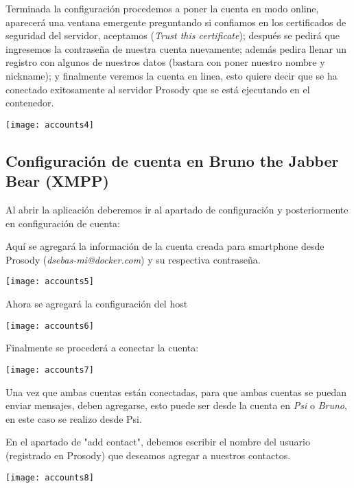 \documentclass[10pt,letterpaper]{article}
\begin{document}
Terminada la configuración procedemos a poner la cuenta en modo online, aparecerá una ventana emergente preguntando si confiamos en los certificados de seguridad del servidor, aceptamos (\textit{Trust this certificate}); después se pedirá que ingresemos la contraseña de nuestra cuenta nuevamente; además pedira llenar un registro con algunos de nuestros datos (bastara con poner nuestro nombre y nickname); y finalmente veremos la cuenta en linea, esto quiere decir que se ha conectado exitosamente al servidor Prosody que se está ejecutando en el contenedor.

\begin{center}
\texttt{[image: accounts4]}
\end{center}

\subsection{Configuración de cuenta en Bruno the Jabber Bear (XMPP)}

Al abrir la aplicación deberemos ir al apartado de configuración y posteriormente en configuración de cuenta:

Aquí se agregará la información de la cuenta creada para smartphone desde Prosody (\textit{dsebas-mi@docker.com}) y su respectiva contraseña.

\begin{center}
\texttt{[image: accounts5]}
\end{center}

Ahora se agregará la configuración del host

\begin{center}
\texttt{[image: accounts6]}
\end{center}

Finalmente se procederá a conectar la cuenta: 

\begin{center}
\texttt{[image: accounts7]}
\end{center}

Una vez que ambas cuentas están conectadas, para que ambas cuentas se puedan enviar mensajes, deben agregarse, esto puede ser desde la cuenta en \textit{Psi} o \textit{Bruno}, en este caso se realizo desde Psi.

En el apartado de "add contact", debemos escribir el nombre del usuario (registrado en Prosody) que deseamos agregar a nuestros contactos.

\begin{center}
\texttt{[image: accounts8]}
\end{center}
\end{document}
